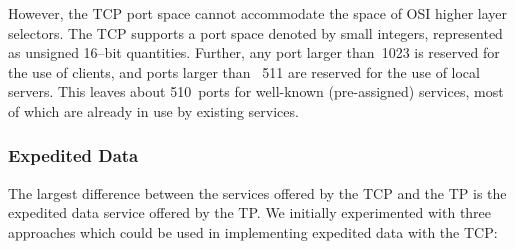 However,
the TCP port space cannot accommodate the space of OSI higher layer selectors.
The TCP supports a port space denoted by small integers,
represented as unsigned 16--bit quantities.
Further, any port larger than~1023 is reserved for the use of clients,
and ports larger than ~511 are reserved for the use of local servers.
This leaves about 510~ports for well-known (pre-assigned) services,
most of which are already in use by existing services.

\subsubsection	{Expedited Data}
The largest difference between the services offered by the TCP and the TP is
the expedited data service offered by the TP.
We initially experimented with three approaches which could be used in
implementing expedited data with the TCP:
